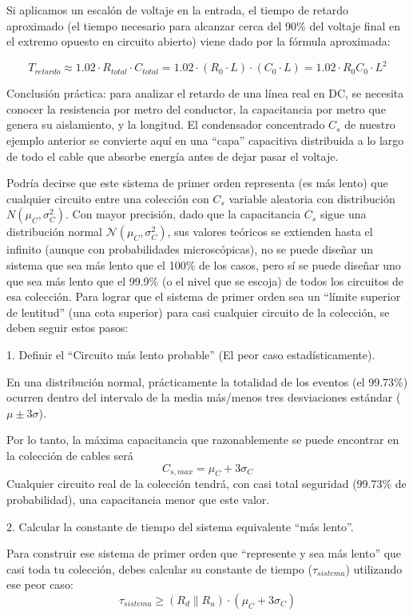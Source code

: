 \documentclass[11pt, a4paper]{article}
\theoremstyle{definition}
\theoremstyle{plain}
\theoremstyle{plain}
\theoremstyle{remark}
\theoremstyle{remark}
\theoremstyle{remark}
\begin{document}
Si aplicamos un escalón de voltaje en la entrada, el tiempo de retardo aproximado (el tiempo necesario para alcanzar cerca del 90\% del voltaje final en el extremo opuesto en circuito abierto) viene dado por la fórmula aproximada:

$$T_{retardo} \approx 1.02 \cdot R_{total} \cdot C_{total} = 1.02 \cdot (R_0 \cdot L) \cdot (C_0 \cdot L) = 1.02 \cdot R_0 C_0 \cdot L^2$$ 

Conclusión práctica: para analizar el retardo de una línea real en DC, se necesita conocer la resistencia por metro del conductor, la capacitancia por metro que genera su aislamiento, y la longitud. El condensador concentrado $C_s$ de nuestro ejemplo anterior se convierte aquí en una ``capa'' capacitiva distribuida a lo largo de todo el cable que absorbe energía antes de dejar pasar el voltaje. 


Podría decirse que este sistema de primer orden representa (es más lento) que cualquier circuito entre una colección con $C_s$ variable aleatoria con distribución $N(\mu_C, \sigma^2_C)$. Con mayor precisión, dado que la capacitancia $C_s$ sigue una distribución normal $\mathcal{N}(\mu_C, \sigma_C^2)$, sus valores teóricos se extienden hasta el infinito (aunque con probabilidades microscópicas), no se puede diseñar un sistema que sea más lento que el 100\% de los casos, pero sí se puede diseñar uno que sea más lento que el 99.9\% (o el nivel que se escoja) de todos los circuitos de esa colección. Para lograr que el sistema de primer orden sea un ``límite superior de lentitud'' (una cota superior) para casi cualquier circuito de la colección, se deben seguir estos pasos:

1. Definir el ``Circuito más lento probable'' (El peor caso estadísticamente).

En una distribución normal, prácticamente la totalidad de los eventos (el 99.73\%) ocurren dentro del intervalo de la media más/menos tres desviaciones estándar ($\mu \pm 3\sigma$).

Por lo tanto, la máxima capacitancia que razonablemente se puede encontrar en la colección de cables será
$$C_{s,max} = \mu_C + 3\sigma_C$$ 
Cualquier circuito real de la colección tendrá, con casi total seguridad (99.73\% de probabilidad), una capacitancia menor que este valor.

2. Calcular la constante de tiempo del sistema equivalente ``más lento''.

Para construir ese sistema de primer orden que ``represente y sea más lento'' que casi toda tu colección, debes calcular su constante de tiempo ($\tau_{sistema}$) utilizando ese peor caso:
$$\tau_{sistema} \ge (R_d \parallel R_u) \cdot (\mu_C + 3\sigma_C)$$ 
\end{document}

